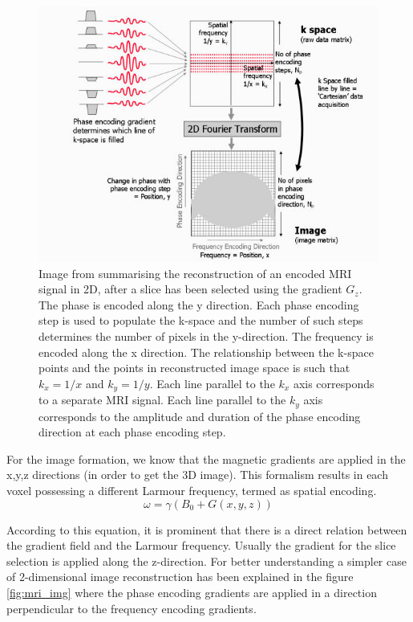 \documentclass[msthesis.tex]{subfiles}
\begin{document}
\begin{figure}
    \centering
    \includegraphics[width=\textwidth]{images/img_reconstruction.jpg}
    \caption{Image from \cite{MRIrecon} summarising the reconstruction of an encoded MRI signal in 2D, after a slice has been selected using the gradient $G_z$. The phase is encoded along the y direction. Each phase encoding step is used to populate the k-space and the number of such steps determines the number of pixels in the y-direction. The frequency is encoded along the x direction. The relationship between the k-space points and the points in reconstructed image space is such that $k_x =1/x$ and $k_y= 1/y$. Each line parallel to the $k_x$ axis corresponds to a separate MRI signal. Each line parallel to the $k_y$ axis corresponds to the amplitude and duration of the phase encoding direction at each phase encoding step.}
    \label{fig:mri_img}
\end{figure}

For the image formation, we know that the magnetic gradients are applied in the x,y,z directions (in order to get the 3D image). This formalism results in each voxel possessing a different Larmour frequency, termed as spatial encoding. 
\begin{equation}
        \label{eq:larmour_grad}
          \omega = \gamma(B_0 + G(x, y, z))
     \end{equation}
       
According to this equation, it is prominent that there is a direct relation between the gradient field and the Larmour frequency. Usually the gradient for the slice selection is applied along the z-direction. For better understanding a simpler case of 2-dimensional image reconstruction has been explained in the figure \autoref{fig:mri_img} where the phase encoding gradients are applied in a direction perpendicular to the frequency encoding gradients.
\end{document}
